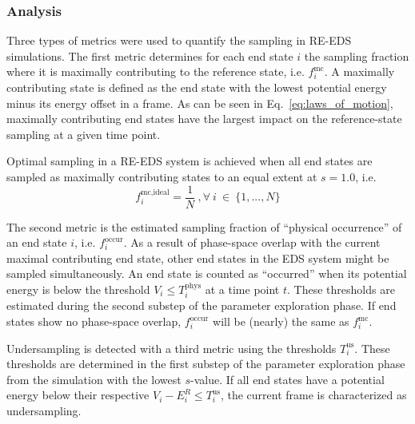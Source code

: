 \subsubsection{Analysis}
\label{metrics}
Three types of metrics were used to quantify the sampling in RE-EDS simulations. The first metric determines for each end state $i$ the sampling fraction where it is maximally contributing to the reference state, i.e. $f_i^{\text{mc}}$. A maximally contributing state is defined as the end state with the lowest potential energy minus its energy offset in a frame. As can be seen in  Eq.~\eqref{eq:laws_of_motion}, maximally contributing end states have the largest impact on the reference-state sampling at a given time point.

%
Optimal sampling in a RE-EDS system is achieved when all end states are sampled as maximally contributing states to an equal extent at $s=1.0$, i.e. 
\begin{equation}
f_{i}^{\text{mc,ideal}} = \frac{1}{N} ~, \forall ~ i~\in~ \{1, ..., N\}
\label{eq: optimalDominationSamplingDist}
\end{equation}

The second metric is the estimated sampling fraction of ``physical occurrence'' of an end state $i$, i.e. $f_i^{\text{occur}}$. As a result of phase-space overlap with the current maximal contributing end state, other end states in the EDS system might be sampled simultaneously. An end state is counted as ``occurred'' when its potential energy is below the threshold $V_i \leq T_{i}^{\text{phys}}$ at a time point $t$. 
These thresholds are estimated during the second substep of the parameter exploration phase. If end states show no phase-space overlap, $f_i^{\text{occur}}$ will be (nearly) the same as $f_i^{\text{mc}}$. 

Undersampling is detected with a third metric using the thresholds $T_{i}^{\text{us}}$. These thresholds are determined in the first substep of the parameter exploration phase from the simulation with the lowest $s$-value. If all end states have a potential energy below their respective $V_i - E^R_i \leq T_{i}^{\text{us}}$, the current frame is characterized as undersampling. \cite{Sidler2016} 
